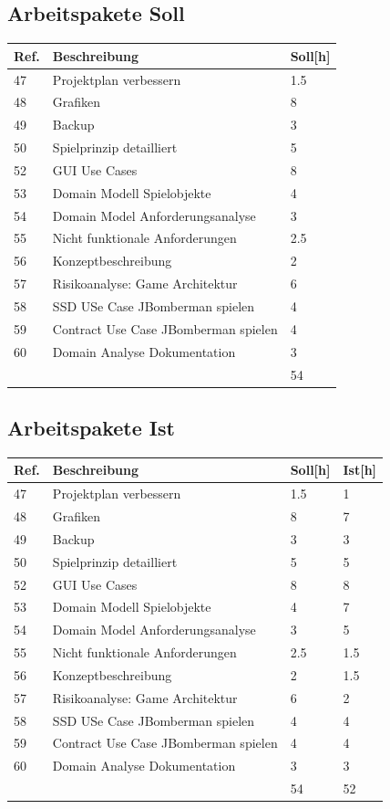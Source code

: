\documentclass[11pt]{scrartcl}
\begin{document}
\subsection{Arbeitspakete Soll}
  \begin{tabularx} {\linewidth}{lXl}
    \bf{Ref.}  & \bf{Beschreibung} & \bf{Soll[h]} \\
    \hline
    47 & Projektplan verbessern & 1.5 \\
    48 & Grafiken & 8 \\
    49 &  Backup & 3 \\
    50 & Spielprinzip detailliert & 5 \\
    52 &  GUI Use Cases & 8 \\
    53 & Domain Modell Spielobjekte & 4\\
    54 & Domain Model Anforderungsanalyse & 3\\
    55 & Nicht funktionale Anforderungen & 2.5 \\
    56 & Konzeptbeschreibung & 2 \\
    57 & Risikoanalyse: Game Architektur  & 6 \\
    58 & SSD USe Case JBomberman spielen & 4 \\
    59 & Contract Use Case JBomberman spielen & 4\\
    60 & 	Domain Analyse Dokumentation & 3 \\
    \hline
    & & 54
  \end{tabularx}
  
  \subsection{Arbeitspakete Ist}
  \begin{tabularx} {\linewidth}{lXll}
    \bf{Ref.}  & \bf{Beschreibung} & \bf{Soll[h]}  & \bf{Ist[h]}\\
    \hline
    47 & Projektplan verbessern & 1.5 & 1\\
    48 & Grafiken & 8 & 7\\
    49 &  Backup & 3 & 3\\
    50 & Spielprinzip detailliert & 5 & 5\\
    52 &  GUI Use Cases & 8 & 8\\
    53 & Domain Modell Spielobjekte & 4 & 7\\
    54 & Domain Model Anforderungsanalyse & 3 & 5\\
    55 & Nicht funktionale Anforderungen & 2.5 & 1.5\\
    56 & Konzeptbeschreibung & 2 & 1.5\\
    57 & Risikoanalyse: Game Architektur  & 6 & 2\\
    58 & SSD USe Case JBomberman spielen & 4 & 4\\
    59 & Contract Use Case JBomberman spielen & 4 & 4\\
    60 & 	Domain Analyse Dokumentation & 3 & 3 \\
    \hline
    & & 54 & 52
    \end{tabularx}
\end{document}
